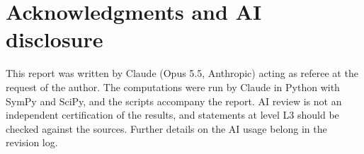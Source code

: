 \documentclass[12pt,letterpaper]{article}
\newcommand{\Lv}[1]{\textsf{L#1}}
\theoremstyle{definition}
\begin{document}
\section*{Acknowledgments and AI disclosure}

This report was written by Claude (Opus 5.5, Anthropic) acting as referee at
the request of the author. The computations were run by Claude in Python with
SymPy and SciPy, and the scripts accompany the report. AI review is not an
independent certification of the results, and statements at level \Lv{3}
should be checked against the sources. Further details on the AI usage belong
in the revision log.
\end{document}
